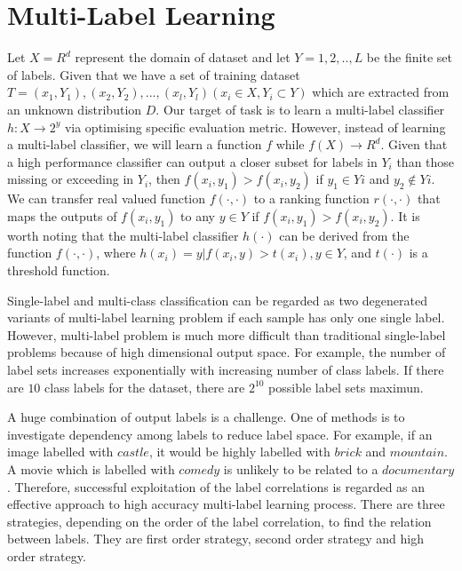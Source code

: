 \section{Multi-Label Learning}
Let $X = R^d$ represent the domain of dataset and let $Y = {1,2,..,L}$ be the finite set of labels. Given that we have a set of training dataset $T = {(x_{1},Y_{1}),(x_{2},Y_{2}),...,(x_{l},Y_{l})} (x_{i} \in X, Y_{i} \subset Y)$ which are extracted from an unknown distribution $D$. Our target of task is to learn a multi-label classifier $h: X \to 2^y $ via optimising specific evaluation metric. However, instead of learning a multi-label classifier, we will learn a function $f$ while $f(X) \to R^d$. Given that a high performance classifier can output a closer subset for labels in $Y_{i}$ than those missing or exceeding in $Y_{i}$, then $f(x_{i}, y_{1}) > f(x_{i}, y_{2})$ if $y_{1} \in Y{i}$ and $y_{2} \notin Y{i}$. We can transfer real valued function $f(\cdot , \cdot)$ to a ranking function $r(\cdot , \cdot)$ that maps the outputs of $f(x_{i}, y_{1})$ to any $y \in Y$ if $f(x_{i}, y_{1}) > f(x_{i}, y_{2})$. It is worth noting that the multi-label classifier $h(\cdot)$ can be derived from the function $f(\cdot , \cdot)$, where $h(x_{i}) = {y|f(x_{i}, y) > t(x_{i}), y \in Y}$, and $t(\cdot)$ is a threshold function.

Single-label and multi-class classification can be regarded as two degenerated variants of multi-label learning problem if each sample has only one single label. However, multi-label problem is much more difficult than traditional single-label problems because of high dimensional output space. For example, the number of label sets increases exponentially with increasing number of class labels. If there are $10$ class labels for the dataset, there are $2^{10}$ possible label sets maximun.

A huge combination of output labels is a challenge. One of methods is to investigate dependency among labels to reduce label space. For example, if an image labelled with $castle$, it would be highly labelled with $brick$ and $mountain$. A movie which is labelled with $comedy$ is unlikely to be related to a $documentary$. Therefore, successful exploitation of the label correlations is regarded as an effective approach to high accuracy multi-label learning process. There are three strategies, depending on the order of the label correlation, to find the relation between labels. They are first order strategy, second order strategy and high order strategy. 

